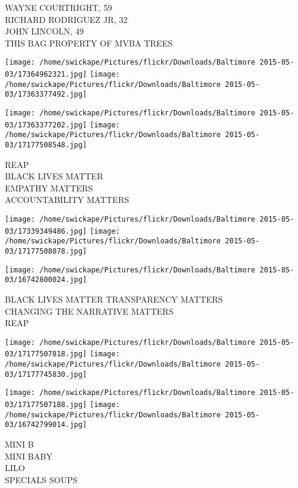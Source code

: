 \documentclass[10pt,letterpaper]{article}
\begin{document}
WAYNE COURTRIGHT, 59\\
RICHARD RODRIGUEZ JR, 32\\
JOHN LINCOLN, 49\\
THIS BAG PROPERTY OF MVBA TREES\\
\pagebreak

\texttt{[image: /home/swickape/Pictures/flickr/Downloads/Baltimore 2015-05-03/17364962321.jpg]}
\texttt{[image: /home/swickape/Pictures/flickr/Downloads/Baltimore 2015-05-03/17363377492.jpg]}

\texttt{[image: /home/swickape/Pictures/flickr/Downloads/Baltimore 2015-05-03/17363377202.jpg]}
\texttt{[image: /home/swickape/Pictures/flickr/Downloads/Baltimore 2015-05-03/17177508548.jpg]}

REAP\\
BLACK LIVES MATTER\\
EMPATHY MATTERS\\
ACCOUNTABILITY MATTERS\\
\pagebreak

\texttt{[image: /home/swickape/Pictures/flickr/Downloads/Baltimore 2015-05-03/17339349486.jpg]}
\texttt{[image: /home/swickape/Pictures/flickr/Downloads/Baltimore 2015-05-03/17177508078.jpg]}

\vspace{0.25in}
\texttt{[image: /home/swickape/Pictures/flickr/Downloads/Baltimore 2015-05-03/16742800024.jpg]}

BLACK LIVES MATTER TRANSPARENCY MATTERS\\
CHANGING THE NARRATIVE MATTERS\\
REAP\\
\pagebreak

\texttt{[image: /home/swickape/Pictures/flickr/Downloads/Baltimore 2015-05-03/17177507818.jpg]}
\texttt{[image: /home/swickape/Pictures/flickr/Downloads/Baltimore 2015-05-03/17177745830.jpg]}

\texttt{[image: /home/swickape/Pictures/flickr/Downloads/Baltimore 2015-05-03/17177507188.jpg]}
\texttt{[image: /home/swickape/Pictures/flickr/Downloads/Baltimore 2015-05-03/16742799014.jpg]}

MINI B\\
MINI BABY\\
LILO\\
SPECIALS SOUPS\\
\pagebreak
\end{document}
